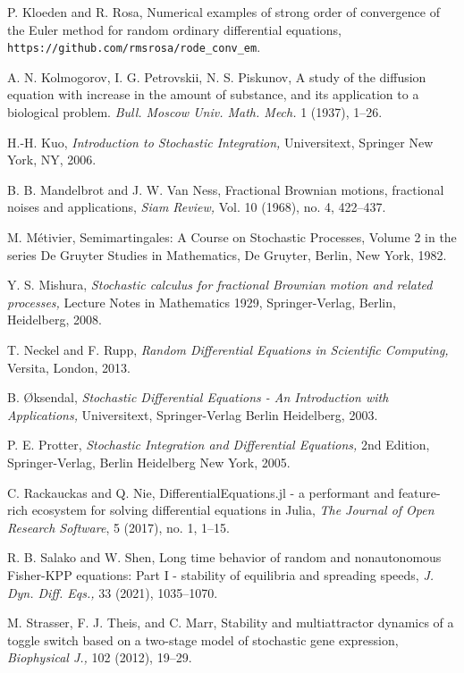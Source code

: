 \documentclass[reqno,12pt]{amsart}
\theoremstyle{plain} %
\theoremstyle{definition} %
\begin{document}
\begin{thebibliography}{25}
     P. Kloeden and R. Rosa, Numerical examples of strong order of convergence of the Euler method for random ordinary differential equations, \texttt{https://github.com/rmsrosa/rode\_conv\_em}.

     A. N. Kolmogorov, I. G. Petrovskii, N. S. Piskunov, A study of the diffusion equation with increase in the amount of substance, and its application to a biological problem. \emph{Bull. Moscow Univ. Math. Mech.} 1 (1937), 1--26.

     H.-H. Kuo, \emph{Introduction to Stochastic Integration,} Universitext, Springer New York, NY, 2006.

     B. B. Mandelbrot and J. W. Van Ness, Fractional Brownian motions, fractional noises and applications, \emph{Siam Review,} Vol. 10 (1968), no. 4, 422--437.

     M. M\'etivier, Semimartingales: A Course on Stochastic Processes, Volume 2 in the series De Gruyter Studies in Mathematics, De Gruyter, Berlin, New York, 1982.

     Y. S. Mishura, \emph{Stochastic calculus for fractional Brownian motion and related processes,} Lecture Notes in Mathematics 1929, Springer-Verlag, Berlin, Heidelberg, 2008.

     T. Neckel and F. Rupp, \emph{Random Differential Equations in Scientific Computing,} Versita, London, 2013.

     B. {\O}ksendal, \emph{Stochastic Differential Equations - An Introduction with Applications,} Universitext, Springer-Verlag Berlin Heidelberg, 2003.

     P. E. Protter, \emph{Stochastic Integration and Differential Equations,} 2nd Edition, Springer-Verlag, Berlin Heidelberg New York, 2005.

     C. Rackauckas and Q. Nie, DifferentialEquations.jl - a performant and feature-rich ecosystem for solving differential equations in Julia, \emph{The Journal of Open Research Software}, 5 (2017), no. 1, 1--15.

     R. B. Salako and W. Shen, Long time behavior of random and nonautonomous Fisher-KPP equations: Part I - stability of equilibria and spreading speeds, \emph{J. Dyn. Diff. Eqs.,} 33 (2021), 1035--1070.

     M. Strasser, F. J. Theis, and C. Marr, Stability and multiattractor dynamics of a toggle switch based on a two-stage model of stochastic gene expression, \emph{Biophysical J.,} 102 (2012), 19--29.


\end{thebibliography}
\end{document}
